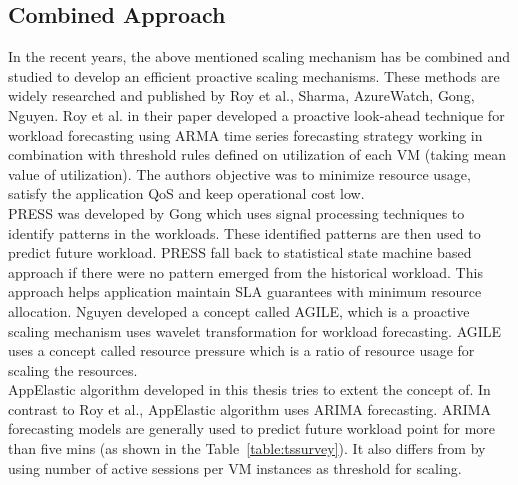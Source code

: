 \subsection{Combined Approach}
\label{sub:Combined Approach}
In the recent years, the above mentioned scaling mechanism has be combined and studied to develop an efficient proactive scaling mechanisms. These methods are widely researched and published by Roy et al.\cite{roy2011efficient}, Sharma\cite{sharma2011cost}, AzureWatch\cite{Azurewatch}, Gong\cite{gong2010press}, Nguyen\cite{nguyen2013agile}. Roy et al.\cite{roy2011efficient} in their paper developed a proactive look-ahead technique for workload forecasting using ARMA time series forecasting strategy working in combination with threshold rules defined on utilization of each VM (taking mean value of utilization). The authors objective was to minimize resource usage, satisfy the application QoS and keep operational cost low\cite{galante2012survey}.
\\
PRESS was developed by Gong\cite{gong2010press} which uses signal processing techniques to identify patterns in the workloads. These identified patterns are then used to predict future workload. PRESS fall back to statistical state machine based approach if there were no pattern emerged from the historical workload. This approach helps application maintain SLA guarantees with minimum resource allocation. Nguyen\cite{nguyen2013agile} developed a concept called AGILE, which is a proactive scaling mechanism uses wavelet transformation for workload forecasting\cite{nguyen2013agile}. AGILE uses a concept called resource pressure which is a ratio of resource usage for scaling the resources.
\\
AppElastic algorithm developed in this thesis tries to extent the concept of\cite{roy2011efficient}. In contrast to  Roy et al.\cite{roy2011efficient}, AppElastic algorithm uses ARIMA forecasting. ARIMA forecasting models are generally used to predict future workload point for more than five mins (as shown in the Table~\ref{table:tssurvey}). It also differs from \cite{roy2011efficient} by using number of active sessions per VM instances as threshold for scaling.

